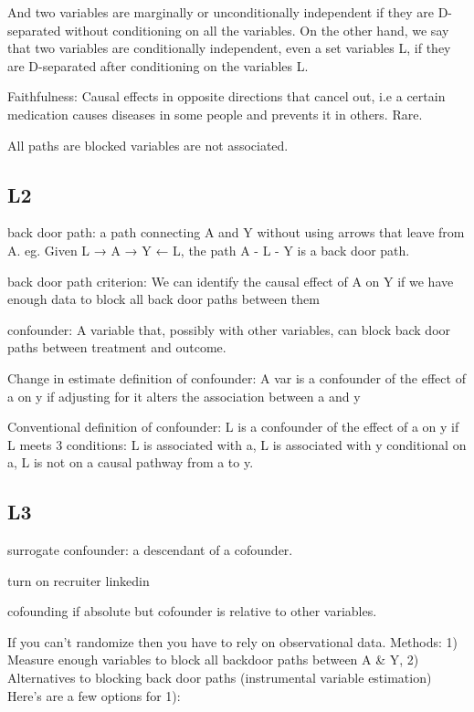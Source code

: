 \documentclass[]{book}
\begin{document}
And two variables are marginally or unconditionally independent if they
are D-separated without conditioning on all the variables. On the other
hand, we say that two variables are conditionally independent, even a
set variables L, if they are D-separated after conditioning on the
variables L.

Faithfulness: Causal effects in opposite directions that cancel out, i.e
a certain medication causes diseases in some people and prevents it in
others. Rare.

All paths are blocked variables are not associated.

\subsection{L2}\label{l2}

back door path: a path connecting A and Y without using arrows that
leave from A. eg. Given L → A → Y ← L, the path A - L - Y is a back door
path.

back door path criterion: We can identify the causal effect of A on Y if
we have enough data to block all back door paths between them

confounder: A variable that, possibly with other variables, can block
back door paths between treatment and outcome.

Change in estimate definition of confounder: A var is a confounder of
the effect of a on y if adjusting for it alters the association between
a and y

Conventional definition of confounder: L is a confounder of the effect
of a on y if L meets 3 conditions: L is associated with a, L is
associated with y conditional on a, L is not on a causal pathway from a
to y.

\subsection{L3}\label{l3}

surrogate confounder: a descendant of a cofounder.

turn on recruiter linkedin

cofounding if absolute but cofounder is relative to other variables.

If you can't randomize then you have to rely on observational data.
Methods: 1) Measure enough variables to block all backdoor paths between
A \& Y, 2) Alternatives to blocking back door paths (instrumental
variable estimation) Here's are a few options for 1):
\end{document}
